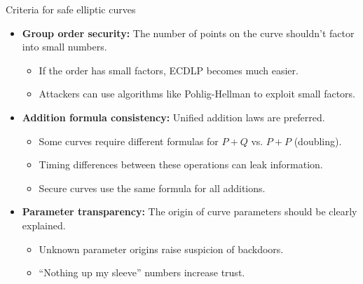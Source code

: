 \documentclass[aspectratio=169, lualatex, handout]{beamer}
\begin{document}
\begin{frame}{Criteria for safe elliptic curves}
	\begin{itemize}
		\item \textbf{Group order security:} The number of points on the curve shouldn't factor into small numbers.
		      \begin{itemize}
			      \item If the order has small factors, ECDLP becomes much easier.
			      \item Attackers can use algorithms like Pohlig-Hellman to exploit small factors.
		      \end{itemize}
		\item \textbf{Addition formula consistency:} Unified addition laws are preferred.
		      \begin{itemize}
			      \item Some curves require different formulas for $P + Q$ vs. $P + P$ (doubling).
			      \item Timing differences between these operations can leak information.
			      \item Secure curves use the same formula for all additions.
		      \end{itemize}
		\item \textbf{Parameter transparency:} The origin of curve parameters should be clearly explained.
		      \begin{itemize}
			      \item Unknown parameter origins raise suspicion of backdoors.
			      \item ``Nothing up my sleeve'' numbers increase trust.
		      \end{itemize}
	\end{itemize}
\end{frame}
\end{document}
